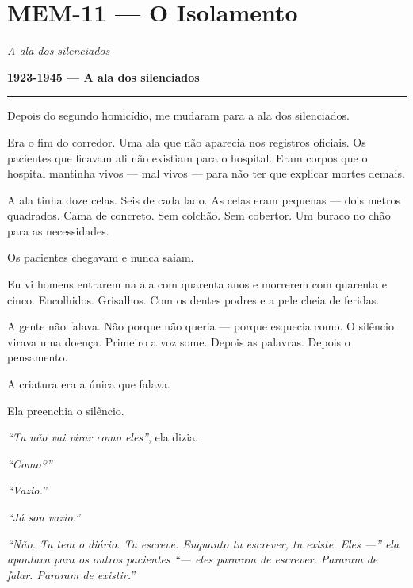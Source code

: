\section*{\textbf{MEM-11} --- O Isolamento}

\noindent \textit{A ala dos silenciados}

\noindent \textbf{1923-1945 --- A ala dos silenciados}

\vspace{0.5em}\noindent\rule{\textwidth}{0.5pt}\vspace{0.5em}

\noindent Depois do segundo homicídio, me mudaram para a ala dos silenciados.

\noindent Era o fim do corredor. Uma ala que não aparecia nos registros oficiais. Os pacientes que ficavam ali não existiam para o hospital. Eram corpos que o hospital mantinha vivos --- mal vivos --- para não ter que explicar mortes demais.

\noindent A ala tinha doze celas. Seis de cada lado. As celas eram pequenas --- dois metros quadrados. Cama de concreto. Sem colchão. Sem cobertor. Um buraco no chão para as necessidades.

\noindent Os pacientes chegavam e nunca saíam.

\noindent Eu vi homens entrarem na ala com quarenta anos e morrerem com quarenta e cinco. Encolhidos. Grisalhos. Com os dentes podres e a pele cheia de feridas.

\noindent A gente não falava. Não porque não queria --- porque esquecia como. O silêncio virava uma doença. Primeiro a voz some. Depois as palavras. Depois o pensamento.

\noindent A criatura era a única que falava.

\noindent Ela preenchia o silêncio.

\noindent \textit{\textquotedblleft{}Tu não vai virar como eles\textquotedblright{}}, ela dizia.

\noindent \textit{\textquotedblleft{}Como?\textquotedblright{}}

\noindent \textit{\textquotedblleft{}Vazio.\textquotedblright{}}

\noindent \textit{\textquotedblleft{}Já sou vazio.\textquotedblright{}}

\noindent \textit{\textquotedblleft{}Não. Tu tem o diário. Tu escreve. Enquanto tu escrever, tu existe. Eles ---\textquotedblright{}\textit{ ela apontava para os outros pacientes }\textquotedblleft{}--- eles pararam de escrever. Pararam de falar. Pararam de existir.\textquotedblright{}}

